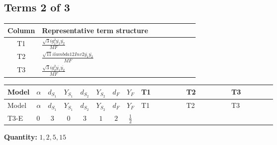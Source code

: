 \documentclass[8pt]{article}
\begin{document}
\begin{landscape}
\subsection*{Terms 2 of 3}
\begin{center}
\begin{tabular}{@{}c >{\raggedright\arraybackslash}p{0.82\linewidth}@{}}
\toprule
Column & Representative term structure \\
\midrule
T1 & \(\displaystyle \frac{\sqrt{3} i g_{1}^{2} \overline{y_{1}} \overline{y_{2}}}{MF}\) \\
\midrule
T2 & \(\displaystyle \frac{\sqrt{11} i lambda12Inv2 \overline{y_{1}} \overline{y_{2}}}{MF}\) \\
\midrule
T3 & \(\displaystyle \frac{\sqrt{3} i g_{2}^{2} \overline{y_{1}} \overline{y_{2}}}{MF}\) \\
\midrule
\bottomrule
\end{tabular}
\end{center}
\smallskip
\tiny
\begin{longtable}{@{}llcccccc >{\raggedright\arraybackslash}p{0.21\linewidth} >{\raggedright\arraybackslash}p{0.21\linewidth} >{\raggedright\arraybackslash}p{0.21\linewidth}@{}}
\toprule
Model & $\alpha$ & $d_{S_1}$ & $Y_{S_1}$ & $d_{S_2}$ & $Y_{S_2}$ & $d_F$ & $Y_F$ & T1 & T2 & T3 \\
\midrule
\endfirsthead
\toprule
Model & $\alpha$ & $d_{S_1}$ & $Y_{S_1}$ & $d_{S_2}$ & $Y_{S_2}$ & $d_F$ & $Y_F$ & T1 & T2 & T3 \\
\midrule
\endhead
T3-E & $0$ & $3$ & $0$ & $3$ & $1$ & $2$ & $\frac{1}{2}$ & \scriptsize\adjustbox{max width=\linewidth}{$\begin{gathered} \frac{\sqrt{3} i g_{1}^{2} \overline{y_{1}} \overline{y_{2}}}{8 MF}\end{gathered}$} & \scriptsize\adjustbox{max width=\linewidth}{$\begin{gathered} \frac{3 \sqrt{11} i lambda12Inv2 \overline{y_{1}} \overline{y_{2}}}{22 MF}\end{gathered}$} & \scriptsize\adjustbox{max width=\linewidth}{$\begin{gathered} \frac{15 \sqrt{3} i g_{2}^{2} \overline{y_{1}} \overline{y_{2}}}{8 MF}\end{gathered}$} \\
\midrule
\bottomrule
\end{longtable}
\clearpage
\noindent\textbf{Quantity: }$\mathrm{1,2,5,15}$\par\smallskip

\end{landscape}
\end{document}
